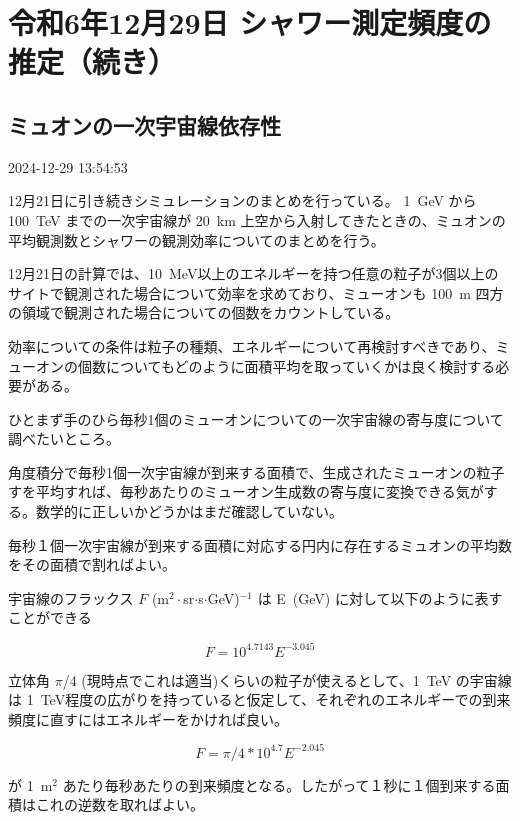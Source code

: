 
\section{令和6年12月29日 シャワー測定頻度の推定（続き）}
\subsection{ミュオンの一次宇宙線依存性}

2024-12-29 13:54:53

12月21日に引き続きシミュレーションのまとめを行っている。
1~GeV から 100~TeV までの一次宇宙線が 20~km 上空から入射してきたときの、ミュオンの平均観測数とシャワーの観測効率についてのまとめを行う。

12月21日の計算では、10~MeV以上のエネルギーを持つ任意の粒子が3個以上のサイトで観測された場合について効率を求めており、ミューオンも 100~m 四方の領域で観測された場合についての個数をカウントしている。

効率についての条件は粒子の種類、エネルギーについて再検討すべきであり、ミューオンの個数についてもどのように面積平均を取っていくかは良く検討する必要がある。

ひとまず手のひら毎秒1個のミューオンについての一次宇宙線の寄与度について調べたいところ。

角度積分で毎秒1個一次宇宙線が到来する面積で、生成されたミューオンの粒子すを平均すれば、毎秒あたりのミューオン生成数の寄与度に変換できる気がする。数学的に正しいかどうかはまだ確認していない。

毎秒１個一次宇宙線が到来する面積に対応する円内に存在するミュオンの平均数をその面積で割ればよい。

宇宙線のフラックス $F$ (m$^{2}\cdot$sr$\cdot$s$\cdot$GeV)$^{-1}$ は E~(GeV) に対して以下のように表すことができる

\begin{equation}
   F = 10^{4.7143} E^{-3.045}
\end{equation}

立体角 $\pi$/4 (現時点でこれは適当)くらいの粒子が使えるとして、1~TeV の宇宙線は 1~TeV程度の広がりを持っていると仮定して、それぞれのエネルギーでの到来頻度に直すにはエネルギーをかければ良い。

\begin{equation}
   F = \pi/4 * 10^{4.7} E^{-2.045}
\end{equation}

が 1~m$^2$ あたり毎秒あたりの到来頻度となる。したがって１秒に１個到来する面積はこれの逆数を取ればよい。

